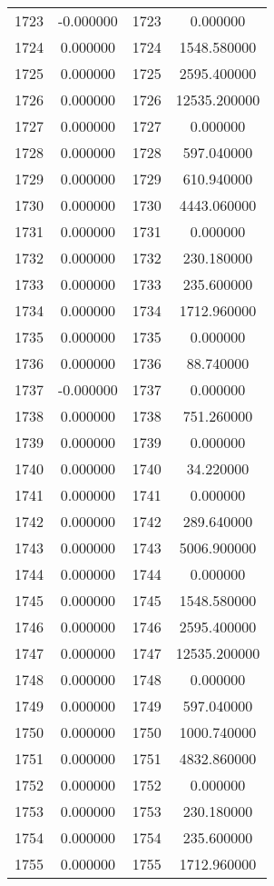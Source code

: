 \documentclass[12pt]{article}
\begin{document}
\begin{longtable}{@{}cccc@{}}
1723 & -0.000000 & 1723 & 0.000000 \\
1724 & 0.000000 & 1724 & 1548.580000 \\
1725 & 0.000000 & 1725 & 2595.400000 \\
1726 & 0.000000 & 1726 & 12535.200000 \\
1727 & 0.000000 & 1727 & 0.000000 \\
1728 & 0.000000 & 1728 & 597.040000 \\
1729 & 0.000000 & 1729 & 610.940000 \\
1730 & 0.000000 & 1730 & 4443.060000 \\
1731 & 0.000000 & 1731 & 0.000000 \\
1732 & 0.000000 & 1732 & 230.180000 \\
1733 & 0.000000 & 1733 & 235.600000 \\
1734 & 0.000000 & 1734 & 1712.960000 \\
1735 & 0.000000 & 1735 & 0.000000 \\
1736 & 0.000000 & 1736 & 88.740000 \\
1737 & -0.000000 & 1737 & 0.000000 \\
1738 & 0.000000 & 1738 & 751.260000 \\
1739 & 0.000000 & 1739 & 0.000000 \\
1740 & 0.000000 & 1740 & 34.220000 \\
1741 & 0.000000 & 1741 & 0.000000 \\
1742 & 0.000000 & 1742 & 289.640000 \\
1743 & 0.000000 & 1743 & 5006.900000 \\
1744 & 0.000000 & 1744 & 0.000000 \\
1745 & 0.000000 & 1745 & 1548.580000 \\
1746 & 0.000000 & 1746 & 2595.400000 \\
1747 & 0.000000 & 1747 & 12535.200000 \\
1748 & 0.000000 & 1748 & 0.000000 \\
1749 & 0.000000 & 1749 & 597.040000 \\
1750 & 0.000000 & 1750 & 1000.740000 \\
1751 & 0.000000 & 1751 & 4832.860000 \\
1752 & 0.000000 & 1752 & 0.000000 \\
1753 & 0.000000 & 1753 & 230.180000 \\
1754 & 0.000000 & 1754 & 235.600000 \\
1755 & 0.000000 & 1755 & 1712.960000 \\

\end{longtable}
\end{document}
